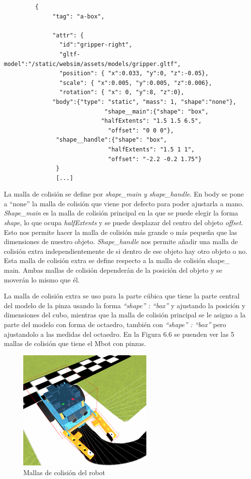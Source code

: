 \begin{lstlisting}         
         {
              "tag": "a-box",

              "attr": {
                "id":"gripper-right",
		        "gltf-model":"/static/websim/assets/models/gripper.gltf",
                "position": { "x":0.033, "y":0, "z":-0.05},
                "scale": { "x":0.005, "y":0.005, "z":0.006},
                "rotation": { "x": 0, "y":8, "z":0},
 			  "body":{"type": "static", "mass": 1, "shape":"none"},
                             "shape__main":{"shape": "box",
			                "halfExtents": "1.5 1.5 6.5",
                              "offset": "0 0 0"},
		       "shape__handle":{"shape": "box",
                              "halfExtents": "1.5 1 1",
                              "offset": "-2.2 -0.2 1.75"}
               }
               [...]
\end{lstlisting}


La malla de colisión se define por \textit{shape\_main y shape\_handle}. En body se pone a ``none'' la malla de colisión que viene por defecto para poder ajustarla a mano.
\textit{Shape\_main} es la malla de colisión principal en la que se puede elegir la forma \textit{shape}, lo que ocupa \textit{halfExtents} y se puede desplazar del centro del objeto \textit{offset}. Esto nos permite hacer la malla de colisión más grande o más pequeña que las dimensiones de nuestro objeto. \textit{ Shape\_handle} nos permite añadir una malla de colisión extra independientemente de si dentro de ese  objeto hay otro objeto o no. Esta malla de colisión extra se define respecto a la malla de colisión shape\_ main. Ambas mallas de colisión dependerán de la posición del objeto y se moverán lo mismo que él.

La malla de colisión extra se uso para la parte cúbica que tiene la parte central del modelo de la pinza usando la forma  \textit{ ``shape'' : ``box''} y ajustando  la posición y dimensiones del cubo, mientras que la malla de colisión principal se le asigno a la parte del modelo con forma de octaedro, también con \textit{ ``shape'' : ``box''} pero ajustandolo a las medidas del octaedro. En la Figura  6.6 se puenden ver las 5 mallas de colisión que tiene el Mbot con pinzas.

 \begin{figure}[H]
  \centering
 \includegraphics[width=0.6\textwidth, height=0.5\textwidth]{chapters/images/mallas.png}
  \caption{Mallas de colisión del robot}
\end{figure}

